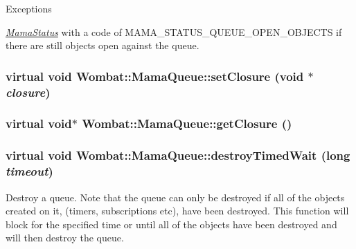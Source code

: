 \begin{DoxyExceptions}{Exceptions}
\item[{\em \hyperlink{classWombat_1_1MamaStatus}{MamaStatus}}]with a code of MAMA\_\-STATUS\_\-QUEUE\_\-OPEN\_\-OBJECTS if there are still objects open against the queue. \end{DoxyExceptions}
\hypertarget{classWombat_1_1MamaQueue_a5e4ea93c990531720075e28f27cf8f9d}{
\subsubsection[{setClosure}]{\setlength{\rightskip}{0pt plus 5cm}virtual void Wombat::MamaQueue::setClosure (void $\ast$ {\em closure})}}
\label{classWombat_1_1MamaQueue_a5e4ea93c990531720075e28f27cf8f9d}
\hypertarget{classWombat_1_1MamaQueue_a3c964b97c67511bfa2f994790d6ba291}{
\subsubsection[{getClosure}]{\setlength{\rightskip}{0pt plus 5cm}virtual void$\ast$ Wombat::MamaQueue::getClosure ()}}
\label{classWombat_1_1MamaQueue_a3c964b97c67511bfa2f994790d6ba291}
\hypertarget{classWombat_1_1MamaQueue_a6bd9863e8aab8b7ca7d10120dc6eb2c5}{
\subsubsection[{destroyTimedWait}]{\setlength{\rightskip}{0pt plus 5cm}virtual void Wombat::MamaQueue::destroyTimedWait (long {\em timeout})}}
\label{classWombat_1_1MamaQueue_a6bd9863e8aab8b7ca7d10120dc6eb2c5}


Destroy a queue. Note that the queue can only be destroyed if all of the objects created on it, (timers, subscriptions etc), have been destroyed. This function will block for the specified time or until all of the objects have been destroyed and will then destroy the queue.


